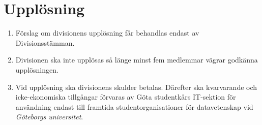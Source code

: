 \documentclass{dvd}
\begin{document}
	\section{Upplösning}

	\begin{enumerate}[label=\arabic* §, ref=\arabic*]

		\item Förslag om divisionens upplösning får behandlas endast av Divisionsstämman.

		\item Divisionen ska inte upplösas så länge minst fem medlemmar vägrar godkänna upplösningen.

		\item Vid upplösning ska divisionens skulder betalas.
		Därefter ska kvarvarande och icke-ekonomiska tillgångar förvaras av Göta studentkårs IT-sektion för användning endast till framtida studentorganisationer för datavetenskap vid \emph{Göteborgs universitet}.

	\end{enumerate}
\end{document}
